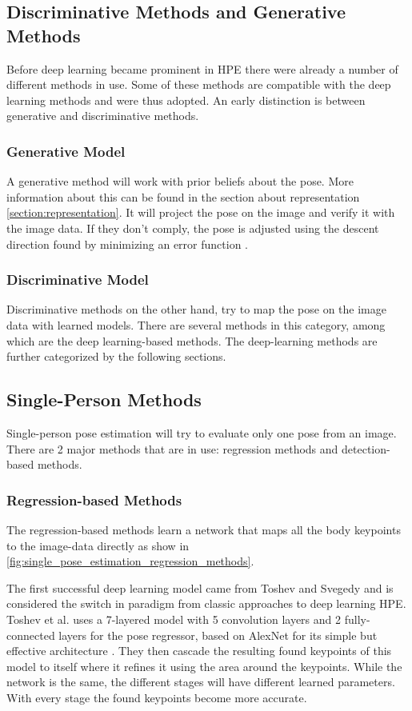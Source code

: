 \subsection{Discriminative Methods and Generative Methods}
Before deep learning became prominent in \gls{HPE} there were already a number of different methods in use.
Some of these methods are compatible with the deep learning methods and were thus adopted.
An early distinction is between generative and discriminative methods.

\subsubsection{Generative Model}
A generative method will work with prior beliefs about the pose.
More information about this can be found in the section about representation \ref{section:representation}.
It will project the pose on the image and verify it with the image data.
If they don't comply, the pose is adjusted using the descent direction found by minimizing an error function \cite{Pons-Moll2011}.

\subsubsection{Discriminative Model}
Discriminative methods on the other hand, try to map the pose on the image data with learned models.
There are several methods in this category, among which are the deep learning-based methods.
The deep-learning methods are further categorized by the following sections.

\subsection{Single-Person Methods}
Single-person pose estimation will try to evaluate only one pose from an image.
There are 2 major methods that are in use: regression methods and detection-based methods.

\subsubsection{Regression-based Methods}
The regression-based methods learn a network that maps all the body keypoints to the image-data directly as show in \ref{fig:single_pose_estimation_regression_methods}.

The first successful deep learning model came from Toshev and Svegedy \cite{Toshev2014} and is considered the switch in paradigm from classic approaches to deep learning \gls{HPE}.
Toshev et al. uses a 7-layered model with 5 convolution layers and 2 fully-connected layers for the pose regressor, based on AlexNet for its simple but effective architecture \cite{AlexNet}.
They then cascade the resulting found keypoints of this model to itself where it refines it using the area around the keypoints.
While the network is the same, the different stages will have different learned parameters.
With every stage the found keypoints become more accurate.

